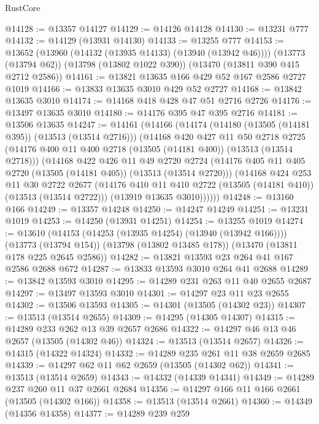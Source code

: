 \begin{lexlean}{RustCore}
\begin{coremodule}
@14128 := @13357 @14127
@14129 := @14126 @14128
@14130 := @13231 @777
@14132 := @14129 (@13931 @14130)
@14133 := @13255 @777
@14153 := @13652
    (@13960 (@14132 (@13935 @14133) (@13940 (@13942 @46))))
    (@13773 (@13794 @62))
    (@13798 (@13802 @1022 @390))
    (@13470 (@13811 @390 @415 @2712 @2586))
@14161 := @13821 @13635 @166 @429 @52 @167 @2586 @2727 @1019
@14166 := @13833 @13635 @3010 @429 @52 @2727
@14168 := @13842 @13635 @3010
@14174 := @14168 @418 @428 @47 @51 @2716 @2726
@14176 := @13497 @13635 @3010
@14180 := @14176 @395 @47 @395 @2716
@14181 := @13506 @13635
@14247 := @14161
    (@14166
      (@14174
        (@14180 (@13505 (@14181 @395)) (@13513 (@13514 @2716)))
        (@14168
          @420
          @427
          @11
          @50
          @2718
          @2725
          (@14176 @400 @11 @400 @2718 (@13505 (@14181 @400)) (@13513 (@13514 @2718)))
          (@14168
            @422
            @426
            @11
            @49
            @2720
            @2724
            (@14176 @405 @11 @405 @2720 (@13505 (@14181 @405)) (@13513 (@13514 @2720)))
            (@14168
              @424
              @253
              @11
              @30
              @2722
              @2677
              (@14176 @410 @11 @410 @2722 (@13505 (@14181 @410)) (@13513 (@13514 @2722)))
              (@13919 @13635 @3010))))))
@14248 := @13160 @166
@14249 := @13357 @14248
@14250 := @14247 @14249
@14251 := @13231 @1019
@14253 := @14250 (@13931 @14251)
@14254 := @13255 @1019
@14274 := @13610
    (@14153 (@14253 (@13935 @14254) (@13940 (@13942 @166))))
    (@13773 (@13794 @154))
    (@13798 (@13802 @13485 @178))
    (@13470 (@13811 @178 @225 @2645 @2586))
@14282 := @13821 @13593 @23 @264 @41 @167 @2586 @2688 @672
@14287 := @13833 @13593 @3010 @264 @41 @2688
@14289 := @13842 @13593 @3010
@14295 := @14289 @231 @263 @11 @40 @2655 @2687
@14297 := @13497 @13593 @3010
@14301 := @14297 @23 @11 @23 @2655
@14302 := @13506 @13593
@14305 := @14301 (@13505 (@14302 @23))
@14307 := @13513 (@13514 @2655)
@14309 := @14295 (@14305 @14307)
@14315 := @14289 @233 @262 @13 @39 @2657 @2686
@14322 := @14297 @46 @13 @46 @2657 (@13505 (@14302 @46))
@14324 := @13513 (@13514 @2657)
@14326 := @14315 (@14322 @14324)
@14332 := @14289 @235 @261 @11 @38 @2659 @2685
@14339 := @14297 @62 @11 @62 @2659 (@13505 (@14302 @62))
@14341 := @13513 (@13514 @2659)
@14343 := @14332 (@14339 @14341)
@14349 := @14289 @237 @260 @11 @37 @2661 @2684
@14356 := @14297 @166 @11 @166 @2661 (@13505 (@14302 @166))
@14358 := @13513 (@13514 @2661)
@14360 := @14349 (@14356 @14358)
@14377 := @14289
    @239
    @259

\end{coremodule}
\end{lexlean}
